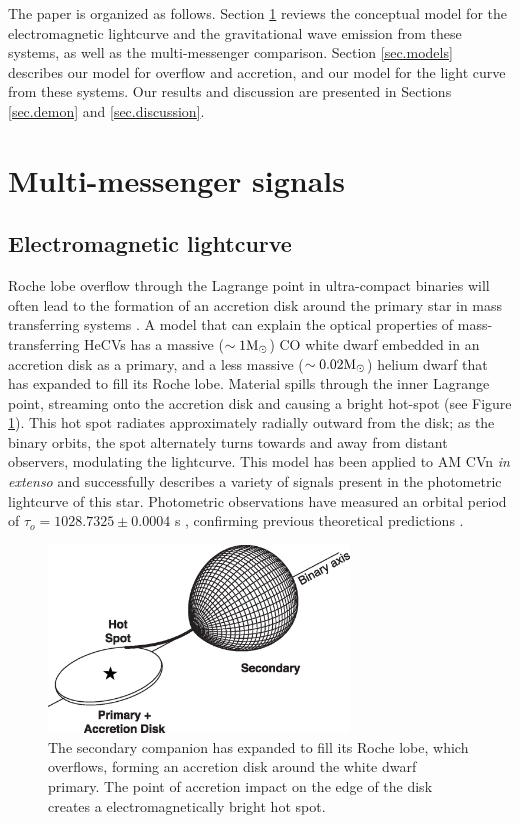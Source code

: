 \documentclass[preprint2]{aastex}
\begin{document}
The paper is organized as follows. Section \ref{sec.emGW} reviews the conceptual
model for the electromagnetic lightcurve and the gravitational wave
emission from these systems, as well as the
multi-messenger comparison.  Section \ref{sec.models} describes our
model for overflow and accretion, and our model for the light
curve from these systems.  Our results and discussion are presented in
Sections \ref{sec.demon} and \ref{sec.discussion}.

\section{Multi-messenger signals}\label{sec.emGW}

\subsection{Electromagnetic lightcurve}\label{sub.emCurve}
Roche lobe overflow through the Lagrange point in ultra-compact
binaries will often lead to the formation of an accretion disk around
the primary star in mass transferring systems
\citep{LubowShu1975,Paczynski1977}.  A model \citep{Warner1995} that
can explain the optical properties of mass-transferring {HeCVs} has
a massive ($\sim 1 \rm{M}_{\odot}$) CO white dwarf embedded in an
accretion disk as a primary, and a less massive ($\sim 0.02
\rm{M}_{\odot}$) helium dwarf that has expanded to fill its
Roche lobe.  Material spills through the inner Lagrange point,
streaming onto the accretion disk and causing a bright hot-spot (see
Figure \ref{fig.overflow}).  This hot spot radiates approximately
radially outward from the disk; as the binary orbits, the spot
alternately turns towards and away from distant observers, modulating
the lightcurve.  This model has been applied to AM CVn {\it in
extenso} \citep{FFW,PHR,PHS} and successfully describes a variety of
signals present in the photometric lightcurve of this star.
Photometric observations have measured an orbital period of $\tau_{o}
= 1028.7325 \pm 0.0004$ s \citep{1998ApJ...493L.105H}, confirming previous
theoretical predictions \citep{PHS}.

\begin{figure}[t!]
  \centering
  \includegraphics[width=80mm]{./binaryModel.eps} 
  \caption{{\small The secondary companion has expanded to fill its 
  Roche lobe, which overflows, forming an accretion disk around the 
  white dwarf primary.  The point of accretion impact on the edge of 
  the disk creates a electromagnetically bright hot spot.}}
  \label{fig.overflow}
\end{figure}
\end{document}

